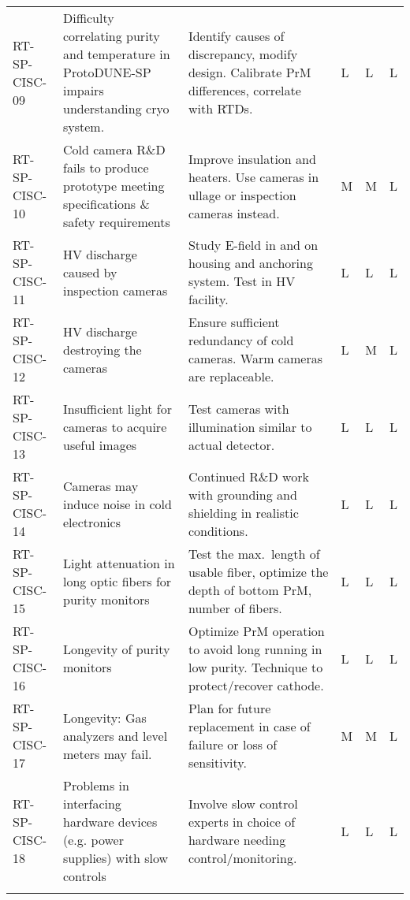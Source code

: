 \begin{footnotesize}
\begin{longtable}{P{0.18\textwidth}P{0.20\textwidth}P{0.32\textwidth}P{0.02\textwidth}P{0.02\textwidth}P{0.02\textwidth}}
RT-SP-CISC-09 & Difficulty correlating purity and temperature in ProtoDUNE-SP impairs understanding cryo system. & Identify causes of discrepancy, modify design. Calibrate PrM differences, correlate with RTDs. & L & L & L \\  \colhline
RT-SP-CISC-10 & Cold camera R\&D fails to produce prototype meeting specifications \& safety requirements & Improve insulation and heaters. Use cameras in ullage or inspection cameras instead. & M & M & L \\  \colhline
RT-SP-CISC-11 & HV discharge caused by inspection cameras & Study E-field in and on housing and anchoring system. Test in HV facility. & L & L & L \\  \colhline
RT-SP-CISC-12 & HV discharge destroying the cameras & Ensure sufficient redundancy of cold cameras. Warm cameras are replaceable. & L & M & L \\  \colhline
RT-SP-CISC-13 & Insufficient light for cameras to acquire useful images & Test cameras with illumination similar to actual detector. & L & L & L \\  \colhline
RT-SP-CISC-14 & Cameras may induce noise in cold electronics & Continued R\&D work with grounding and shielding in realistic conditions. & L & L & L \\  \colhline
RT-SP-CISC-15 & Light attenuation in long optic fibers for purity monitors  & Test the max.\ length of usable fiber, optimize the depth of bottom PrM, number of fibers. & L & L & L \\  \colhline
RT-SP-CISC-16 & Longevity of purity monitors & Optimize PrM operation to avoid long running in low purity. Technique to protect/recover cathode. & L & L & L \\  \colhline
RT-SP-CISC-17 & Longevity: Gas analyzers and level meters may fail. & Plan for future replacement in case of failure or loss of sensitivity.  & M & M & L \\  \colhline
RT-SP-CISC-18 & Problems in interfacing  hardware devices (e.g. power supplies) with slow controls & Involve slow control experts in choice of hardware needing control/monitoring.
 & L & L & L \\  \colhline

\label{tab:risks:SP-FD-CISC}
\end{longtable}
\end{footnotesize}
